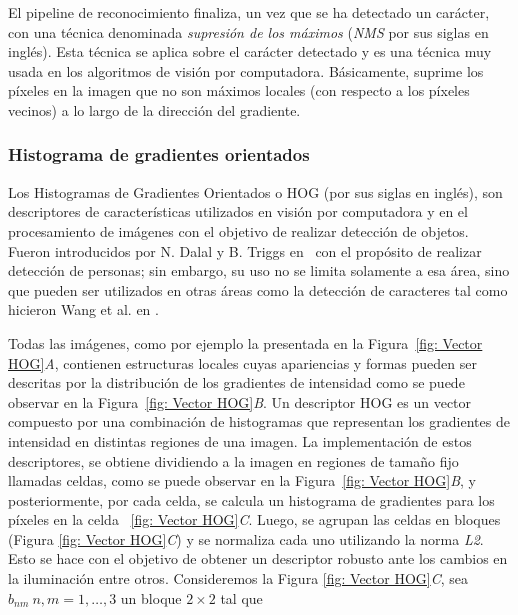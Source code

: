 	
	El pipeline de reconocimiento finaliza, un vez que se ha detectado un carácter, con una técnica denominada \textit{supresión de los máximos} (\textit{NMS} por sus siglas en inglés). Esta técnica se aplica sobre el carácter detectado y es una técnica muy usada en los algoritmos de visión por computadora. Básicamente, suprime los píxeles en la imagen que no son máximos locales (con respecto a los píxeles vecinos) a lo largo de la dirección del gradiente.

\subsubsection{Histograma de gradientes orientados}
\label{subsubsection:hog}

	Los Histogramas de Gradientes Orientados o HOG (por sus siglas en inglés), son descriptores de características utilizados en visión por computadora y en el procesamiento de imágenes con el objetivo de realizar detección de objetos. Fueron introducidos por N. Dalal y B. Triggs en~\cite{DT05} con el propósito de realizar detección de personas; sin embargo, su uso no se limita solamente a esa área, sino que pueden ser utilizados en otras áreas como la detección de caracteres tal como hicieron Wang et al. en \cite{wang}.
	
	Todas las imágenes, como por ejemplo la presentada en la Figura~\ref{fig: Vector HOG}\textit{A}, contienen estructuras locales cuyas apariencias y formas pueden ser descritas por la distribución de los gradientes de intensidad como se puede observar en la Figura~\ref{fig: Vector HOG}\textit{B}.
	Un descriptor HOG es un vector compuesto por una combinación de histogramas que representan los gradientes de intensidad en distintas regiones de una imagen. La implementación de estos descriptores, se obtiene dividiendo a la imagen en regiones de tamaño fijo llamadas celdas, como se puede observar en la Figura~\ref{fig: Vector HOG}\textit{B}, y posteriormente, por cada celda, se calcula un histograma de gradientes para los píxeles en la celda ~\ref{fig: Vector HOG}\textit{C}.
	Luego, se agrupan las celdas en bloques (Figura \ref{fig: Vector HOG}\textit{C}) y se normaliza cada uno utilizando la norma \textit{L2}. Esto se hace con el objetivo de obtener un descriptor robusto ante los cambios en la iluminación entre otros. Consideremos la Figura \ref{fig: Vector HOG}\textit{C}, sea $b_{nm}~n,m=1,\dots,3$ un bloque $2 \times 2$ tal que 
	
